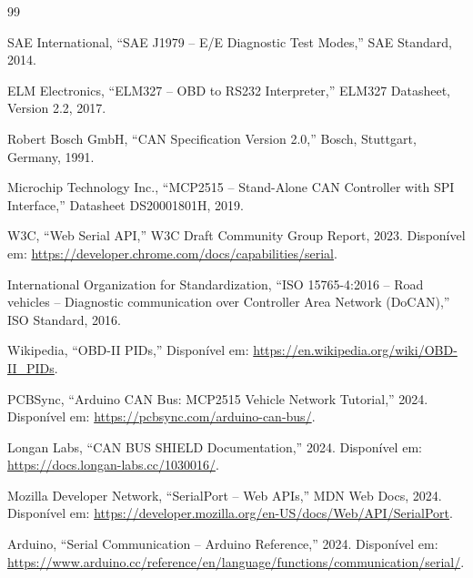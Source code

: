 \begin{thebibliography}{99}

SAE International, ``SAE J1979 -- E/E Diagnostic Test Modes,'' SAE Standard, 2014.

ELM Electronics, ``ELM327 -- OBD to RS232 Interpreter,'' ELM327 Datasheet, Version 2.2, 2017.

Robert Bosch GmbH, ``CAN Specification Version 2.0,'' Bosch, Stuttgart, Germany, 1991.

Microchip Technology Inc., ``MCP2515 -- Stand-Alone CAN Controller with SPI Interface,'' Datasheet DS20001801H, 2019.

W3C, ``Web Serial API,'' W3C Draft Community Group Report, 2023. Disponível em: \url{https://developer.chrome.com/docs/capabilities/serial}.

International Organization for Standardization, ``ISO 15765-4:2016 -- Road vehicles -- Diagnostic communication over Controller Area Network (DoCAN),'' ISO Standard, 2016.

Wikipedia, ``OBD-II PIDs,'' Disponível em: \url{https://en.wikipedia.org/wiki/OBD-II_PIDs}.

PCBSync, ``Arduino CAN Bus: MCP2515 Vehicle Network Tutorial,'' 2024. Disponível em: \url{https://pcbsync.com/arduino-can-bus/}.

Longan Labs, ``CAN BUS SHIELD Documentation,'' 2024. Disponível em: \url{https://docs.longan-labs.cc/1030016/}.

Mozilla Developer Network, ``SerialPort -- Web APIs,'' MDN Web Docs, 2024. Disponível em: \url{https://developer.mozilla.org/en-US/docs/Web/API/SerialPort}.

Arduino, ``Serial Communication -- Arduino Reference,'' 2024. Disponível em: \url{https://www.arduino.cc/reference/en/language/functions/communication/serial/}.

\end{thebibliography}